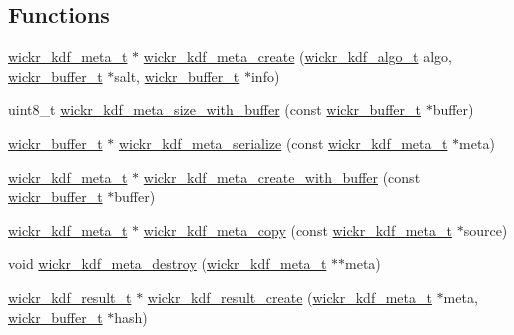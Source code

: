 \subsection*{Functions}
\begin{DoxyCompactItemize}
\item 
\mbox{\hyperlink{structwickr__kdf__meta}{wickr\+\_\+kdf\+\_\+meta\+\_\+t}} $\ast$ \mbox{\hyperlink{group__wickr__kdf_gaeee99bcfbf94fd964158ac402e2deb48}{wickr\+\_\+kdf\+\_\+meta\+\_\+create}} (\mbox{\hyperlink{structwickr__kdf__algo}{wickr\+\_\+kdf\+\_\+algo\+\_\+t}} algo, \mbox{\hyperlink{structwickr__buffer}{wickr\+\_\+buffer\+\_\+t}} $\ast$salt, \mbox{\hyperlink{structwickr__buffer}{wickr\+\_\+buffer\+\_\+t}} $\ast$info)
\item 
uint8\+\_\+t \mbox{\hyperlink{group__wickr__kdf_ga92020ae3e8ffb469c927d17f95a7dff1}{wickr\+\_\+kdf\+\_\+meta\+\_\+size\+\_\+with\+\_\+buffer}} (const \mbox{\hyperlink{structwickr__buffer}{wickr\+\_\+buffer\+\_\+t}} $\ast$buffer)
\item 
\mbox{\hyperlink{structwickr__buffer}{wickr\+\_\+buffer\+\_\+t}} $\ast$ \mbox{\hyperlink{group__wickr__kdf_ga1bc501706b4a8a727dfd34f8a00e56da}{wickr\+\_\+kdf\+\_\+meta\+\_\+serialize}} (const \mbox{\hyperlink{structwickr__kdf__meta}{wickr\+\_\+kdf\+\_\+meta\+\_\+t}} $\ast$meta)
\item 
\mbox{\hyperlink{structwickr__kdf__meta}{wickr\+\_\+kdf\+\_\+meta\+\_\+t}} $\ast$ \mbox{\hyperlink{group__wickr__kdf_gaebd1caf94717c403c4afb5cca8f511b6}{wickr\+\_\+kdf\+\_\+meta\+\_\+create\+\_\+with\+\_\+buffer}} (const \mbox{\hyperlink{structwickr__buffer}{wickr\+\_\+buffer\+\_\+t}} $\ast$buffer)
\item 
\mbox{\hyperlink{structwickr__kdf__meta}{wickr\+\_\+kdf\+\_\+meta\+\_\+t}} $\ast$ \mbox{\hyperlink{group__wickr__kdf_ga6ed878108fd58ee420239689de505190}{wickr\+\_\+kdf\+\_\+meta\+\_\+copy}} (const \mbox{\hyperlink{structwickr__kdf__meta}{wickr\+\_\+kdf\+\_\+meta\+\_\+t}} $\ast$source)
\item 
void \mbox{\hyperlink{group__wickr__kdf_ga2bd458ae83d4d5bb03b9d0835baeefd7}{wickr\+\_\+kdf\+\_\+meta\+\_\+destroy}} (\mbox{\hyperlink{structwickr__kdf__meta}{wickr\+\_\+kdf\+\_\+meta\+\_\+t}} $\ast$$\ast$meta)
\item 
\mbox{\hyperlink{structwickr__kdf__result}{wickr\+\_\+kdf\+\_\+result\+\_\+t}} $\ast$ \mbox{\hyperlink{group__wickr__kdf_ga514c095b3b2f1ead49bd7fbf0b427407}{wickr\+\_\+kdf\+\_\+result\+\_\+create}} (\mbox{\hyperlink{structwickr__kdf__meta}{wickr\+\_\+kdf\+\_\+meta\+\_\+t}} $\ast$meta, \mbox{\hyperlink{structwickr__buffer}{wickr\+\_\+buffer\+\_\+t}} $\ast$hash)
$$
\end{DoxyCompactItemize}
